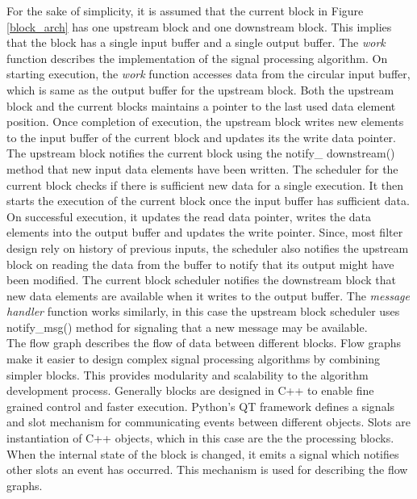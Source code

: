 For the sake of simplicity, it is assumed that the current block in Figure \ref{block_arch} has one upstream block and one downstream block.
This implies that the block has a single input buffer and a single output buffer.
The \textit{work} function describes the implementation of the signal processing algorithm.
On starting execution, the \textit{work} function accesses data from the circular input buffer, which is same as the output buffer for the upstream block.
Both the upstream block and the current blocks maintains a pointer to the last used data element position. 
Once completion of execution, the upstream block writes new elements to the input buffer of the current block and updates its the write data pointer.
The upstream block notifies the current block using the notify\_ downstream() method that new input data elements have been written.
The scheduler for the current block checks if there is sufficient new data for a single execution.
It then starts the execution of the current block once the input buffer has sufficient data.
On successful execution, it updates the read data pointer, writes the data elements into the output buffer and updates the write pointer.
Since, most filter design rely on history of previous inputs, the scheduler also notifies the upstream block on reading the data from the buffer to notify that its output might have been modified.
The current block scheduler notifies the downstream block that new data elements are available when it writes to the output buffer.
The \textit{message handler} function works similarly, in this case the upstream block scheduler uses notify\_msg() method for signaling that a new message may be available.\\

The flow graph describes the flow of data between different blocks.
Flow graphs make it easier to design complex signal processing algorithms by combining simpler blocks.
This provides modularity and scalability to the algorithm development process.
Generally blocks are designed in C++ to enable fine grained control and faster execution.
Python's QT framework defines a signals and slot mechanism for communicating events between different objects.
Slots are instantiation of C++ objects, which in this case are the the processing blocks.
When the internal state of the block is changed, it emits a signal which notifies other slots an event has occurred.
This mechanism is used for describing the flow graphs.


